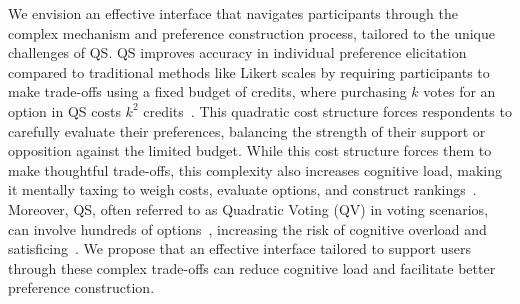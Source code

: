 We envision an effective interface that navigates participants through the complex mechanism and preference construction process, tailored to the unique challenges of QS. QS improves accuracy in individual preference elicitation compared to traditional methods like Likert scales by requiring participants to make trade-offs using a fixed budget of credits, where purchasing $k$ votes for an option in QS costs $k^2$ credits~\cite{quarfoot2017quadratic,chengCanShowWhat2021}. This quadratic cost structure forces respondents to carefully evaluate their preferences, balancing the strength of their support or opposition against the limited budget. While this cost structure forces them to make thoughtful trade-offs, this complexity also increases cognitive load, making it mentally taxing to weigh costs, evaluate options, and construct rankings~\cite{lichtensteinConstructionPreference2006}. Moreover, QS, often referred to as Quadratic Voting (QV) in voting scenarios, can involve hundreds of options~\cite{rogersColoradoTriedNew2019, teamTaiwanDigitalMinister}, increasing the risk of cognitive overload and satisficing~\cite{simonBehavioralModelRational1955, payneAdaptiveStrategySelection1988, tverskyJudgmentsRepresentativeness}. We propose that an effective interface tailored to support users through these complex trade-offs can reduce cognitive load and facilitate better preference construction.


